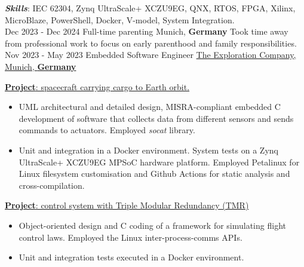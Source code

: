 \documentclass[letterpaper]{twentysecondcv} %
\begin{document}
\begin{twenty}
{            \vspace{2 mm}
            \textbf{\textit{Skills}}: IEC 62304, Zynq UltraScale+ XCZU9EG, QNX, RTOS, FPGA, Xilinx, MicroBlaze, PowerShell, Docker, V-model, System Integration.
        }\\
    \twentyitem
        {Dec 2023 -}
        {Dec 2024}
        {Full-time parenting}
        {Munich, \textbf{Germany}}
        {}
        {
            \vspace{2 mm}
            Took time away from professional work to focus on early parenthood and family responsibilities.
        }\\
    \twentyitem
        {Nov 2023 -}
        {May 2023}
        {Embedded Software Engineer}
        {\href{https://www.exploration.space/}{The Exploration Company, Munich, \textbf{Germany}}}
        {}
        {
            \vspace{2 mm}
            \underline{\textbf{Project}: spacecraft carrying cargo to Earth orbit.}

            \vspace{2 mm}
            \begin{itemize}
                \item UML architectural and detailed design,  MISRA-compliant embedded C development of software that collects data from different sensors and sends commands to actuators. Employed \textit{socat} library.
                \item Unit and integration in a Docker environment.  System tests on a Zynq UltraScale+ XCZU9EG MPSoC hardware platform. Employed Petalinux for Linux filesystem customisation and Github Actions for static analysis and cross-compilation.
            \end{itemize}

            \vspace{2 mm}
            \underline{\textbf{Project}: control system with Triple Modular Redundancy (TMR)}

            \vspace{2 mm}
            \begin{itemize}
                \item Object-oriented design and C coding of a framework for simulating flight control laws. Employed the Linux inter-process-comms APIs.
                \item Unit and integration tests executed in a Docker environment.
            \end{itemize}

}
\end{twenty}
\end{document}
